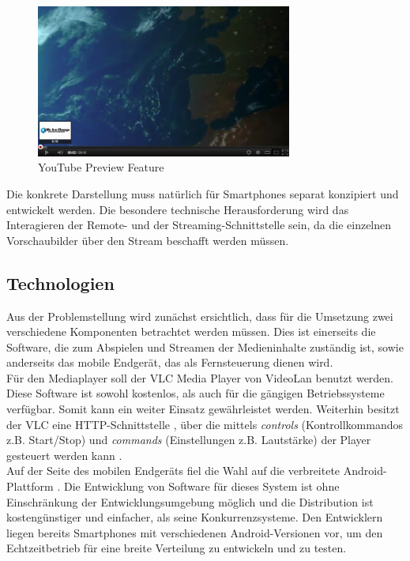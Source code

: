 \documentclass[a4paper,12pt]{article}
\begin{document}
\begin{figure}[H]
\centering
\includegraphics[width=0.75\textwidth]{youtube.png}
\caption{YouTube Preview Feature}
\label{fig:youtube}
\end{figure}

Die konkrete Darstellung muss natürlich für Smartphones separat konzipiert und entwickelt werden. Die besondere technische Herausforderung wird das Interagieren der Remote- und der Streaming-Schnittstelle sein, da die einzelnen Vorschaubilder über den Stream beschafft werden müssen.

\newpage

\subsection{Technologien}
Aus der Problemstellung wird zunächst ersichtlich, dass für die Umsetzung zwei verschiedene Komponenten betrachtet werden müssen. Dies ist einerseits die Software, die zum Abspielen und Streamen der Medieninhalte zuständig ist, sowie anderseits das mobile Endgerät, das als Fernsteuerung dienen wird. \\
Für den Mediaplayer soll der VLC Media Player von VideoLan \cite{VLC} benutzt werden. Diese Software ist sowohl kostenlos, als auch für die gängigen Betriebssysteme verfügbar. Somit kann ein weiter Einsatz gewährleistet werden. Weiterhin besitzt der VLC eine HTTP-Schnittstelle \cite{VLC:WebInterface}, über die mittels \textit{controls} (Kontrollkommandos z.B. Start/Stop) und \textit{commands} (Einstellungen z.B. Lautstärke) der Player gesteuert werden kann \cite{VLC:HowTo}. \\
Auf der Seite des mobilen Endgeräts fiel die Wahl auf die verbreitete Android-Plattform \cite{Android}. Die Entwicklung von Software für dieses System ist ohne Einschränkung der Entwicklungsumgebung möglich und die Distribution ist kostengünstiger und einfacher, als seine Konkurrenzsysteme. Den Entwicklern liegen bereits Smartphones mit verschiedenen Android-Versionen vor, um den Echtzeitbetrieb für eine breite Verteilung zu entwickeln und zu testen.
\end{document}
